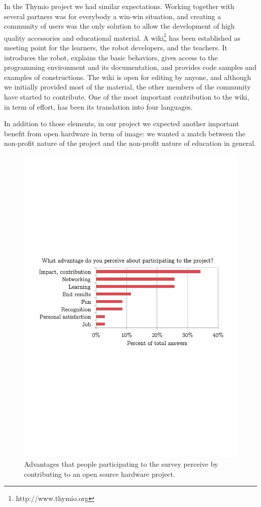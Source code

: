 \documentclass[letterpaper, 10 pt, conference]{ieeeconf}  %
\begin{document}
In the Thymio project we had similar expectations. 
Working together with several partners was for everybody a win-win situation, and creating a community of users was the only solution to allow the development of high quality accessories and educational material.
A wiki\footnote{http://www.thymio.org} has been established as meeting point for the learners, the robot developers, and the teachers.
It introduces the robot, explains the basic behaviors, gives access to the programming environment and its documentation, and provides code samples and examples of constructions.
The wiki is open for editing by anyone, and although we initially provided most of the material, the other members of the community have started to contribute.
One of the most important contribution to the wiki, in term of effort, has been its translation into four languages.

In addition to those elements, in our project we expected another important benefit from open hardware in term of image: we wanted a match between the non-profit nature of the project and the non-profit nature of education in general. 

\begin{figure}
\centering
\includegraphics[width=\columnwidth]{figures/advantages}
\caption{Advantages that people participating to the survey perceive by contributing to an open source hardware project.}
\label{fig:getout}
\end{figure}
\end{document}
